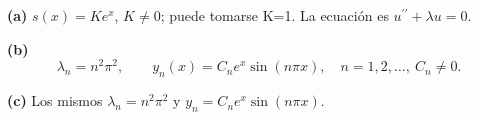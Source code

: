 \noindent\textbf{(a)} \(s(x)=Ke^x\), \(K\ne0\); puede tomarse K=1. La ecuación es \(u^{\prime\prime}+\lambda u=0\).

\noindent\textbf{(b)} \[\lambda_n=n^2\pi^2,\qquad y_n(x)=C_ne^x\sin(n\pi x),\quad n=1,2,\ldots,\ C_n\ne0.\]

\noindent\textbf{(c)} Los mismos \(\lambda_n=n^2\pi^2\) y \(y_n=C_ne^x\sin(n\pi x)\).
